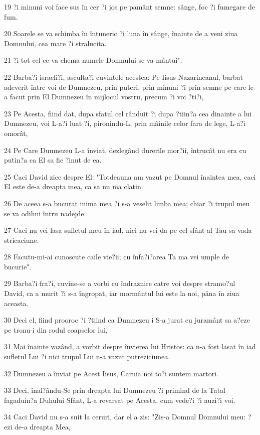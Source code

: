\par 19 ?i minuni voi face sus în cer ?i jos pe pamânt semne: sânge, foc ?i fumegare de fum.
\par 20 Soarele se va schimba în întuneric ?i luna în sânge, înainte de a veni ziua Domnului, cea mare ?i stralucita.
\par 21 ?i tot cel ce va chema numele Domnului se va mântui".
\par 22 Barba?i israeli?i, asculta?i cuvintele acestea: Pe Iisus Nazarineanul, barbat adeverit între voi de Dumnezeu, prin puteri, prin minuni ?i prin semne pe care le-a facut prin El Dumnezeu în mijlocul vostru, precum ?i voi ?ti?i,
\par 23 Pe Acesta, fiind dat, dupa sfatul cel rânduit ?i dupa ?tiin?a cea dinainte a lui Dumnezeu, voi L-a?i luat ?i, pironindu-L, prin mâinile celor fara de lege, L-a?i omorât,
\par 24 Pe Care Dumnezeu L-a înviat, dezlegând durerile mor?ii, întrucât nu era cu putin?a ca El sa fie ?inut de ea.
\par 25 Caci David zice despre El: "Totdeauna am vazut pe Domnul înaintea mea, caci El este de-a dreapta mea, ca sa nu ma clatin.
\par 26 De aceea s-a bucurat inima mea ?i s-a veselit limba mea; chiar ?i trupul meu se va odihni întru nadejde.
\par 27 Caci nu vei lasa sufletul meu în iad, nici nu vei da pe cel sfânt al Tau sa vada stricaciune.
\par 28 Facutu-mi-ai cunoscute caile vie?ii; cu înfa?i?area Ta ma vei umple de bucurie".
\par 29 Barba?i fra?i, cuvine-se a vorbi cu îndraznire catre voi despre stramo?ul David, ca a murit ?i s-a îngropat, iar mormântul lui este la noi, pâna în ziua aceasta.
\par 30 Deci el, fiind prooroc ?i ?tiind ca Dumnezeu i S-a jurat cu juramânt sa a?eze pe tronu-i din rodul coapselor lui,
\par 31 Mai înainte vazând, a vorbit despre învierea lui Hristos: ca n-a fost lasat în iad sufletul Lui ?i nici trupul Lui n-a vazut putreziciunea.
\par 32 Dumnezeu a înviat pe Acest Iisus, Caruia noi to?i suntem martori.
\par 33 Deci, înal?ându-Se prin dreapta lui Dumnezeu ?i primind de la Tatal fagaduin?a Duhului Sfânt, L-a revarsat pe Acesta, cum vede?i ?i auzi?i voi.
\par 34 Caci David nu s-a suit la ceruri, dar el a zis: "Zis-a Domnul Domnului meu: ?ezi de-a dreapta Mea,
